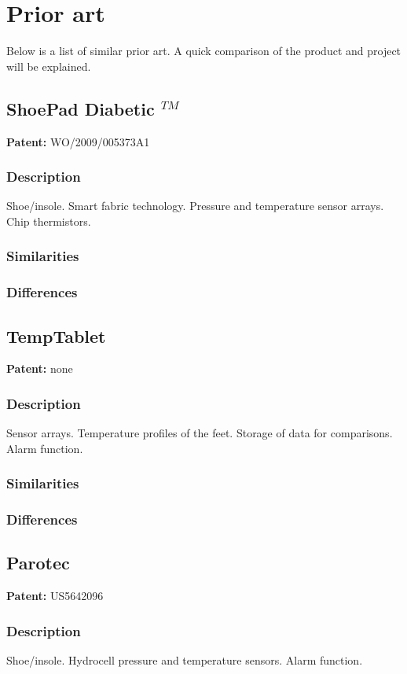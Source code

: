 
\section{Prior art}
Below is a list of similar prior art. A quick comparison of the product and project will be explained.
\subsection{ShoePad Diabetic $^{TM}$}
\textbf{Patent:} WO/2009/005373A1
\subsubsection{Description}
Shoe/insole. Smart fabric technology. Pressure and temperature sensor arrays. Chip thermistors.
\subsubsection{Similarities}

\subsubsection{Differences}

\subsection{TempTablet}
\textbf{Patent:} none
\subsubsection{Description}
Sensor arrays. Temperature profiles of the feet. Storage of data for comparisons. Alarm function.
\subsubsection{Similarities}

\subsubsection{Differences}

\subsection{Parotec}
\textbf{Patent:} US5642096
\subsubsection{Description}
Shoe/insole. Hydrocell pressure and temperature sensors. Alarm function.
